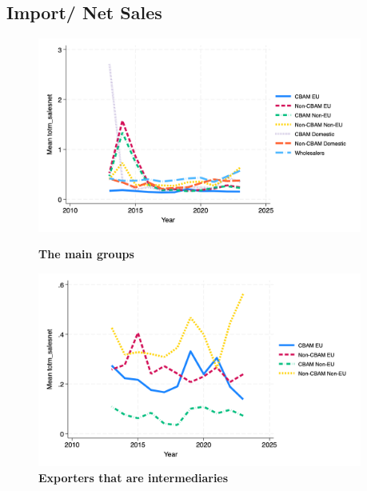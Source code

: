 \documentclass{article}
\begin{document}
\subsection{Import/ Net Sales}
\begin{figure}[H]
\centering
\includegraphics[width=0.95\textwidth]{totm_salesnet_main_groups.png}
\caption{\textbf{The main groups}}
\includegraphics[width=0.95\textwidth]{totm_salesnet_ei.png}
\caption{\textbf{Exporters that are intermediaries}}
\end{figure}
\end{document}
